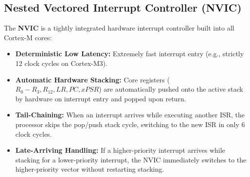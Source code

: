 \documentclass[12pt,a4paper]{article}
\begin{document}
\subsection{Nested Vectored Interrupt Controller (NVIC)}
The \textbf{NVIC} is a tightly integrated hardware interrupt controller built into all Cortex-M cores:
\begin{itemize}[leftmargin=*]
  \item \textbf{Deterministic Low Latency:} Extremely fast interrupt entry (e.g., strictly 12 clock cycles on Cortex-M3).
  \item \textbf{Automatic Hardware Stacking:} Core registers ($R_0-R_3, R_{12}, LR, PC, xPSR$) are automatically pushed onto the active stack by hardware on interrupt entry and popped upon return.
  \item \textbf{Tail-Chaining:} When an interrupt arrives while executing another ISR, the processor skips the pop/push stack cycle, switching to the new ISR in only 6 clock cycles.
  \item \textbf{Late-Arriving Handling:} If a higher-priority interrupt arrives while stacking for a lower-priority interrupt, the NVIC immediately switches to the higher-priority vector without restarting stacking.
\end{itemize}

\begin{tcolorbox}[tikzbox, title={NVIC Low-Latency Tail-Chaining Mechanism}]
\centering
{}
\end{tcolorbox}
\end{document}
